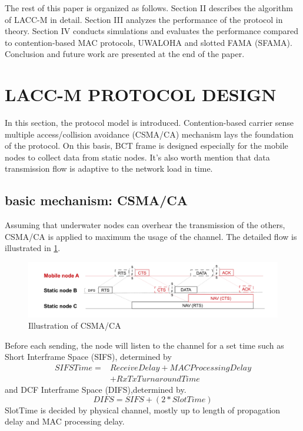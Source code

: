 \documentclass[conference]{IEEEtran}
\begin{document}
The rest of this paper is organized as follows. Section II describes the algorithm of LACC-M in detail. Section III analyzes the performance of the protocol in theory. Section IV conducts simulations and evaluates the performance compared to contention-based MAC protocols, UWALOHA and slotted FAMA (SFAMA). Conclusion and future work are presented at the end of the paper.

\section{LACC-M PROTOCOL DESIGN}

In this section, the protocol model is introduced. Contention-based carrier sense multiple access/collision avoidance (CSMA/CA) mechanism lays the foundation of the protocol. On this basis, BCT frame is designed especially for the mobile nodes to collect data from static nodes. It's also worth mention that data transmission flow is adaptive to the network load in time.

\subsection{basic mechanism: CSMA/CA}

Assuming that underwater nodes can overhear the transmission of the others, CSMA/CA is applied to maximum the usage of the channel. The detailed flow is illustrated in \ref{f1}. 
\begin{figure}[ht]
	\centerline{\includegraphics[scale=0.12]{figures/1.pdf}}
	\caption{Illustration of CSMA/CA}
	\label{f1}
\end{figure}
Before each sending, the node will listen to the channel for a set time such as Short Interframe Space (SIFS), determined by 
\begin{equation*}
\begin{aligned}
SIFSTime=&ReceiveDelay+MACProcessingDelay\\&+RxTxTurnaroundTime
\end{aligned}
\end{equation*} 
and DCF Interframe Space (DIFS),determined by. 
\begin{equation*}
DIFS=SIFS+(2*SlotTime)
\end{equation*}
SlotTime is decided by physical channel, mostly up to length of propagation delay and MAC processing delay.
\end{document}
